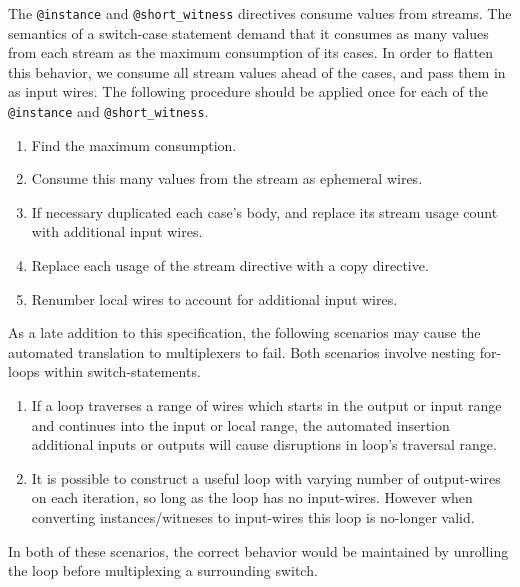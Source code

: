 The \texttt{@instance} and \texttt{@short\_witness} directives consume values from streams.
The semantics of a switch-case statement demand that it consumes as many values from each stream as the maximum consumption of its cases.
In order to flatten this behavior, we consume all stream values ahead of the cases, and pass them in as input wires.
The following procedure should be applied once for each of the \texttt{@instance} and \texttt{@short\_witness}.\\

\begin{enumerate}
    \item Find the maximum consumption.
    \item Consume this many values from the stream as ephemeral wires.
    \item If necessary duplicated each case's body, and replace its stream usage count with additional input wires.
    \item Replace each usage of the stream directive with a copy directive.
    \item Renumber local wires to account for additional input wires.
\end{enumerate}

As a late addition to this specification, the following scenarios may cause the automated translation to multiplexers to fail.
Both scenarios involve nesting for-loops within switch-statements.

\begin{enumerate}
    \item If a loop traverses a range of wires which starts in the output or input range and continues into the input or local range, the automated insertion additional inputs or outputs will cause disruptions in loop's traversal range.
    \item It is possible to construct a useful loop with varying number of output-wires on each iteration, so long as the loop has no input-wires. However when converting instances/witneses to input-wires this loop is no-longer valid.
\end{enumerate}

In both of these scenarios, the correct behavior would be maintained by unrolling the loop before multiplexing a surrounding switch.
